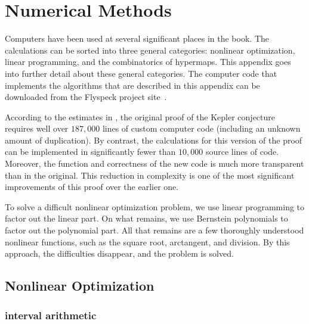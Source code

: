 %
\chapter{Numerical Methods}\label{sec:numerical}

Computers have been used at several significant places in the book.
The calculations can be sorted into three general categories:
nonlinear optimization, linear programming, and the combinatorics of
hypermaps. This appendix goes into further detail about these general
categories. The computer code that implements the algorithms that are
described in this appendix can be downloaded from the Flyspeck project
site~\cite{website:FlyspeckProject}.


According to the estimates in \cite{HHMNOZ}, the original proof of
the Kepler conjecture requires well over $187,000$ lines of custom
computer code (including an unknown amount of duplication).  By
contrast, the calculations for this version of the proof can
be implemented in significantly fewer than $10,000$ source lines of code.
Moreover, the function and correctness of the new code is
much more transparent than in the original.  This reduction in
complexity is one of the most significant improvements of this
proof over the earlier one.  

To solve a difficult nonlinear optimization problem, we use linear
programming to factor out the linear part.  On what remains, we use
Bernstein polynomials to factor out the polynomial part.  All that
remains are a few thoroughly understood nonlinear functions, such as
the square root, arctangent, and division.  By this approach, the
difficulties disappear, and the problem is solved.


\section{Nonlinear Optimization}

\subsection{interval arithmetic}%
\label{sec:bounds-simplex}

